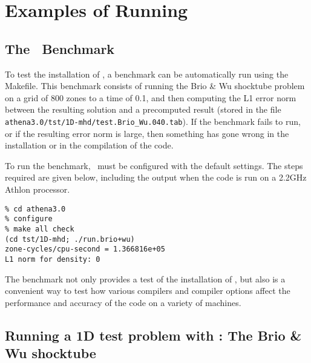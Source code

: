\section{Examples of Running \ath}

\subsection{The \ath\ Benchmark}

To test the installation of \ath, a benchmark can be automatically
run using the Makefile.  This benchmark consists of running the Brio
\& Wu shocktube problem on a grid of 800 zones to a time of 0.1, and
then computing the L1 error norm between the resulting solution and a
precomputed result (stored in the file {\tt
athena3.0/tst/1D-mhd/test.Brio\_Wu.040.tab}).  If the benchmark fails
to run, or if the resulting error norm is large, then something has
gone wrong in the installation or in the compilation of the code.

To run the benchmark, \ath\ must be configured with the default settings.
The steps required are given below, including the output when the code
is run on a 2.2GHz Athlon processor.
\footnotesize
\begin{verbatim}
% cd athena3.0
% configure
% make all check
(cd tst/1D-mhd; ./run.brio+wu)
zone-cycles/cpu-second = 1.366816e+05
L1 norm for density: 0
\end{verbatim}
\normalsize
The benchmark not only provides a test of the installation of \ath, but also
is a convenient way to test how various compilers 
and compiler options affect the performance and accuracy of the code on
a variety of machines.

\subsection{Running a 1D test problem with \ath: The Brio \& Wu shocktube}

